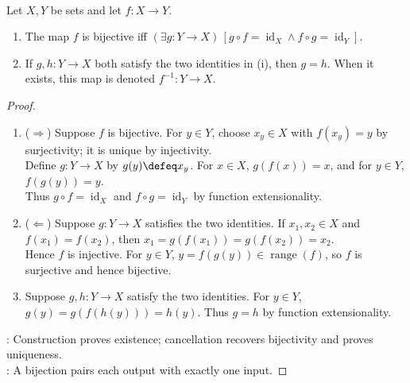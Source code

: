 \begin{theorem} \label{thm:bijective-iff-invertible-function} \\
Let $X,Y$ be sets and let $f:X\to Y$.
\begin{enumerate}[label=(\roman*)]
\setlength{\itemsep}{0pt}
\item The map $f$ is bijective iff $(\exists g:Y\to X)\,[g\circ f=\operatorname{id}_X\land f\circ g=\operatorname{id}_Y]$.
\item If $g,h:Y\to X$ both satisfy the two identities in (i), then $g=h$. When it exists, this map is denoted $f^{-1}:Y\to X$.
\end{enumerate}
\begin{proof}
\begin{enumerate}[label=(\roman*)]
\setlength{\itemsep}{0pt}
\item[$(i)$] ($\Rightarrow$) Suppose $f$ is bijective. For $y\in Y$, choose $x_y\in X$ with $f(x_y)=y$ by surjectivity; it is unique by injectivity.\\
Define $g:Y\to X$ by $g(y)\defeq x_y$. For $x\in X$, $g(f(x))=x$, and for $y\in Y$, $f(g(y))=y$.\\
Thus $g\circ f=\operatorname{id}_X$ and $f\circ g=\operatorname{id}_Y$ by function extensionality.
\item[$(i)$] ($\Leftarrow$) Suppose $g:Y\to X$ satisfies the two identities. If $x_1,x_2\in X$ and $f(x_1)=f(x_2)$, then $x_1=g(f(x_1))=g(f(x_2))=x_2$.\\
Hence $f$ is injective. For $y\in Y$, $y=f(g(y))\in\operatorname{range}(f)$, so $f$ is surjective and hence bijective.
\item[$(ii)$] Suppose $g,h:Y\to X$ satisfy the two identities. For $y\in Y$, $g(y)=g(f(h(y)))=h(y)$. Thus $g=h$ by function extensionality.
\end{enumerate}
: Construction proves existence; cancellation recovers bijectivity and proves uniqueness.\\
: A bijection pairs each output with exactly one input.
\end{proof}
\end{theorem}

